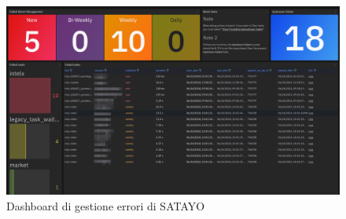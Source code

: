 \begin{figure}[htbp]
  \centering
  \includegraphics[width=.9\linewidth]{images/SATAYO_errors_dashboard.png}
  \caption{Dashboard di gestione errori di SATAYO}
  \label{fig:errors_dash}
\end{figure}